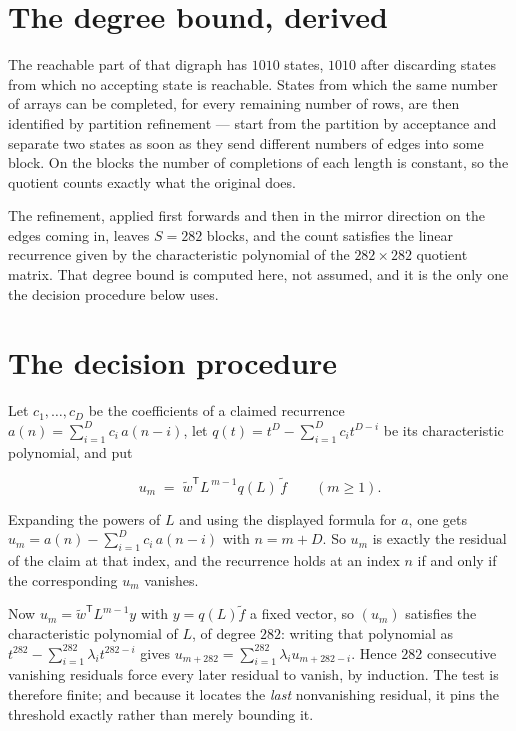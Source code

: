 \documentclass[11pt]{article}
\theoremstyle{definition}
\begin{document}
\section{The degree bound, derived}

The reachable part of that digraph has $1010$ states, $1010$ after discarding states from which no accepting state is reachable. States from which the same number of arrays can be completed, for every remaining number of rows, are then identified by partition refinement --- start from the partition by acceptance and separate two states as soon as they send different numbers of edges into some block. On the blocks the number of completions of each length is constant, so the quotient counts exactly what the original does.

The refinement, applied first forwards and then in the mirror direction on the edges coming in, leaves $S = 282$ blocks, and the count satisfies the linear recurrence given by the characteristic polynomial of the $282 \times 282$ quotient matrix. That degree bound is computed here, not assumed, and it is the only one the decision procedure below uses.

\section{The decision procedure}

Let $c_1,\dots,c_D$ be the coefficients of a claimed recurrence $a(n) = \sum_{i=1}^{D} c_i\,a(n-i)$, let $q(t) = t^{D} - \sum_{i=1}^{D} c_i t^{D-i}$ be its characteristic polynomial, and put

\[u_m \;=\; \tilde w^{\mathsf T} L^{\,m-1} q(L)\,\tilde f \qquad (m \ge 1).\]

Expanding the powers of $L$ and using the displayed formula for $a$, one gets $u_m = a(n) - \sum_{i=1}^{D} c_i\,a(n-i)$ with $n = m + D$. So $u_m$ is exactly the residual of the claim at that index, and the recurrence holds at an index $n$ if and only if the corresponding $u_m$ vanishes.

Now $u_m = \tilde w^{\mathsf T} L^{m-1} y$ with $y = q(L)\tilde f$ a fixed vector, so $(u_m)$ satisfies the characteristic polynomial of $L$, of degree $282$: writing that polynomial as $t^{282} - \sum_{i=1}^{282} \lambda_i t^{282-i}$ gives $u_{m+282} = \sum_{i=1}^{282} \lambda_i u_{m+282-i}$. Hence $282$ consecutive vanishing residuals force every later residual to vanish, by induction. The test is therefore finite; and because it locates the {\itshape last} nonvanishing residual, it pins the threshold exactly rather than merely bounding it.
\end{document}
